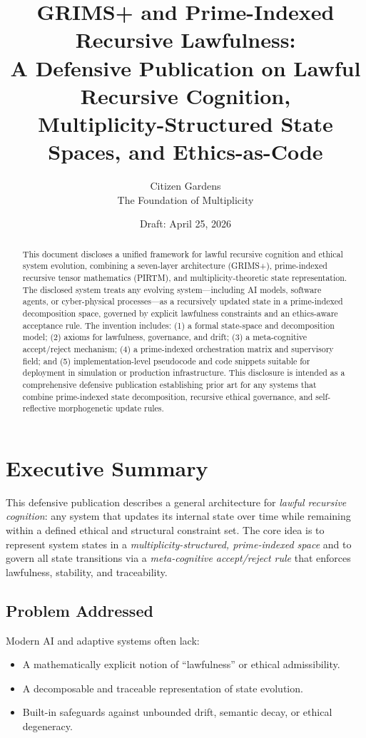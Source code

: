 \documentclass[11pt]{article}
\title{%
GRIMS+ and Prime-Indexed Recursive Lawfulness:\\
A Defensive Publication on Lawful Recursive Cognition,\\
Multiplicity-Structured State Spaces, and Ethics-as-Code
}
\author{Citizen Gardens \\ The Foundation of Multiplicity}
\affil{In Legacy of Nicole Thorp}
\date{Draft: April 25, 2026}
\begin{document}
\maketitle

\begin{abstract}
This document discloses a unified framework for lawful recursive cognition and ethical system evolution, combining a seven-layer architecture (GRIMS+), prime-indexed recursive tensor mathematics (PIRTM), and multiplicity-theoretic state representation.%
The disclosed system treats any evolving system---including AI models, software agents, or cyber-physical processes---as a recursively updated state in a prime-indexed decomposition space, governed by explicit lawfulness constraints and an ethics-aware acceptance rule.%
The invention includes: (1) a formal state-space and decomposition model; (2) axioms for lawfulness, governance, and drift; (3) a meta-cognitive accept/reject mechanism; (4) a prime-indexed orchestration matrix and supervisory field; and (5) implementation-level pseudocode and code snippets suitable for deployment in simulation or production infrastructure.%
This disclosure is intended as a comprehensive defensive publication establishing prior art for any systems that combine prime-indexed state decomposition, recursive ethical governance, and self-reflective morphogenetic update rules.
\end{abstract}
\newpage
\tableofcontents
\newpage
\section{Executive Summary}

This defensive publication describes a general architecture for \emph{lawful recursive cognition}: any system that updates its internal state over time while remaining within a defined ethical and structural constraint set.%
The core idea is to represent system states in a \emph{multiplicity-structured, prime-indexed space} and to govern all state transitions via a \emph{meta-cognitive accept/reject rule} that enforces lawfulness, stability, and traceability.

\subsection{Problem Addressed}

Modern AI and adaptive systems often lack:
\begin{itemize}
  \item A mathematically explicit notion of ``lawfulness'' or ethical admissibility.
  \item A decomposable and traceable representation of state evolution.
  \item Built-in safeguards against unbounded drift, semantic decay, or ethical degeneracy.
\end{itemize}
\end{document}
